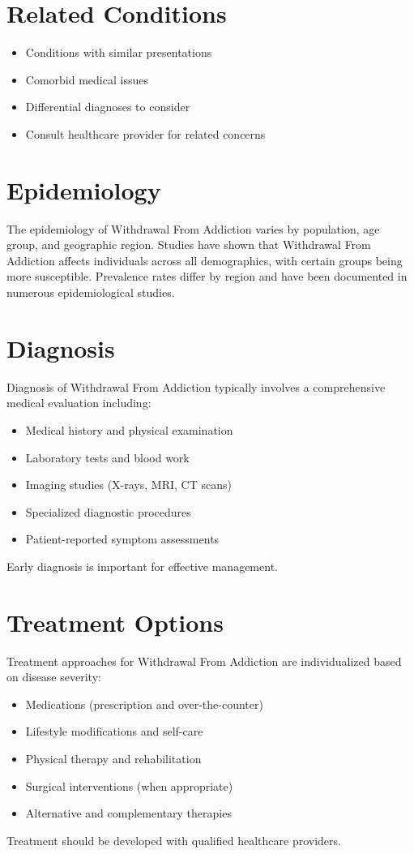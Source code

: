 \section*{Related Conditions}
\begin{itemize}
  \item Conditions with similar presentations
  \item Comorbid medical issues
  \item Differential diagnoses to consider
  \item Consult healthcare provider for related concerns
\end{itemize}

\section*{Epidemiology}
The epidemiology of Withdrawal From Addiction varies by population, age group, and geographic region. Studies have shown that Withdrawal From Addiction affects individuals across all demographics, with certain groups being more susceptible. Prevalence rates differ by region and have been documented in numerous epidemiological studies.

\section*{Diagnosis}
Diagnosis of Withdrawal From Addiction typically involves a comprehensive medical evaluation including:
\begin{itemize}
  \item Medical history and physical examination
  \item Laboratory tests and blood work
  \item Imaging studies (X-rays, MRI, CT scans)
  \item Specialized diagnostic procedures
  \item Patient-reported symptom assessments
\end{itemize}
Early diagnosis is important for effective management.

\section*{Treatment Options}
Treatment approaches for Withdrawal From Addiction are individualized based on disease severity:
\begin{itemize}
  \item Medications (prescription and over-the-counter)
  \item Lifestyle modifications and self-care
  \item Physical therapy and rehabilitation
  \item Surgical interventions (when appropriate)
  \item Alternative and complementary therapies
\end{itemize}
Treatment should be developed with qualified healthcare providers.

